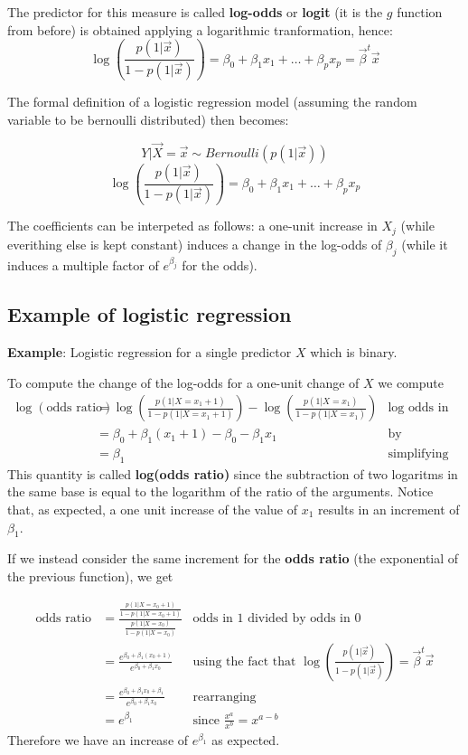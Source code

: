     The predictor for this measure is called \textbf{log-odds} or \textbf{logit} (it is the $g$ function from before) is obtained applying a logarithmic tranformation, hence:
    $$
    \log\left(\frac{p(1|\vec{x})}{1 - p(1|\vec{x})}\right) 
    = \beta_0 + \beta_1 x_1 + \dots + \beta_px_p 
    = \vec{\beta}^t\vec{x}
    $$
    
    The formal definition of a logistic regression model (assuming the random variable to be bernoulli distributed) then becomes:

    $$Y|\vec{X} = \vec{x} \sim Bernoulli(p(1|\vec{x}))$$
    $$\log\left(\frac{p(1|\vec{x})}{1 - p(1|\vec{x})}\right) 
    = \beta_0 + \beta_1 x_1 + \dots + \beta_px_p $$
    
    The coefficients can be interpeted as follows: a one-unit increase in $X_j$ (while everithing else is kept constant) induces a change in the log-odds of $\beta_j$ (while it induces a multiple factor of $e^{\beta_j}$ for the odds).

    \subsection{Example of logistic regression}
    \textbf{Example}: Logistic regression for a single predictor $X$ which is binary.

    To compute the change of the log-odds for a one-unit change of $X$ we compute
    \begin{align*}
    \log(\text{odds ratio})
      & = \log\left(\frac{p(1|X=x_1+1)}{1-p(1|X=x_1+1)}\right)-\log\left(\frac{p(1|X=x_1)}{1-p(1|X=x_1)}\right)
      & \text{log odds in 1 minus log odds in 0}\\
      & = \beta_0 + \beta_1 (x_1 + 1) - \beta_0 - \beta_1x_1 
      & \text{by definition of logistic regression}\\
      & = \beta_1
      & \text{simplifying}
    \end{align*}
    This quantity is called \textbf{log(odds ratio)} since the subtraction of two logaritms in the same base is equal to the logarithm of the ratio of the arguments. Notice that, as expected, a one unit increase of the value of $x_1$ results in an increment of $\beta_1$.

    If we instead consider the same increment for the \textbf{odds ratio} (the exponential of the previous function), we get

    \begin{align*}
      \text{odds ratio}
      & = \frac{\frac{p(1|X=x_0+1)}{1-p(1|X=x_0+1)}}{\frac{p(1|X=x_0)}{1-p(1|X=x_0)}} 
      & \text{odds in 1 divided by odds in 0}\\
      & = \frac{e^{\beta_0 + \beta_1 (x_0 + 1)}}{e^{\beta_0 + \beta_1 x_0}}
      & \text{using the fact that } \log\left(\frac{p(1|\vec{x})}{1 - p(1|\vec{x})}\right)= \vec{\beta}^t\vec{x}\\
      & = \frac{e^{\beta_0 + \beta_1x_0 + \beta_1}}{e^{\beta_0 + \beta_1 x_0}} 
      & \text{rearranging}\\
      & = e^{\beta_1}
      & \text{since } \frac{x^a}{x^b} = x^{a-b}
    \end{align*}
    Therefore we have an increase of $e^{\beta_1}$ as expected.

